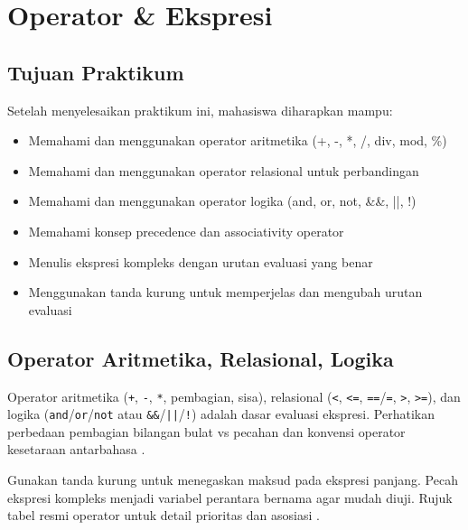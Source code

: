 \documentclass[../main.tex]{subfiles}
\begin{document}
\chapter{Operator \& Ekspresi}

\section*{Tujuan Praktikum}
Setelah menyelesaikan praktikum ini, mahasiswa diharapkan mampu:
\begin{itemize}
  \item Memahami dan menggunakan operator aritmetika (+, -, *, /, div, mod, \%)
  \item Memahami dan menggunakan operator relasional untuk perbandingan
  \item Memahami dan menggunakan operator logika (and, or, not, \&\&, ||, !)
  \item Memahami konsep precedence dan associativity operator
  \item Menulis ekspresi kompleks dengan urutan evaluasi yang benar
  \item Menggunakan tanda kurung untuk memperjelas dan mengubah urutan evaluasi
\end{itemize}

\section{Operator Aritmetika, Relasional, Logika}
Operator aritmetika (\texttt{+}, \texttt{-}, \texttt{*}, pembagian, sisa), relasional (\texttt{\textless}, \texttt{\textless=}, \texttt{==}/\texttt{=}, \texttt{\textgreater}, \texttt{\textgreater=}), dan logika (\texttt{and}/\texttt{or}/\texttt{not} atau \texttt{\&\&}/\texttt{||}/\texttt{!}) adalah dasar evaluasi ekspresi. Perhatikan perbedaan pembagian bilangan bulat vs pecahan dan konvensi operator kesetaraan antarbahasa \parencite{pascal-tutorial-wikibooks,gnu-c-manual,cpp-reference}.

Gunakan tanda kurung untuk menegaskan maksud pada ekspresi panjang. Pecah ekspresi kompleks menjadi variabel perantara bernama agar mudah diuji. Rujuk tabel resmi operator untuk detail prioritas dan asosiasi \parencite{gnu-c-manual,cpp-op-precedence,c-op-precedence}.
\end{document}
